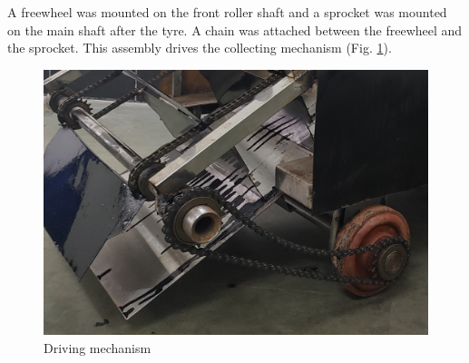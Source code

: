 A freewheel was mounted on the front roller shaft and a sprocket was mounted on the main shaft after the tyre. A chain was attached between the freewheel and the sprocket. This assembly drives the collecting mechanism (Fig. \ref{driving mechanism}).

\begin{figure}[H]
    \centering
    \includegraphics[scale=0.19]{driving mechanism.jpg}
    \caption{Driving mechanism}
    \label{driving mechanism}
\end{figure}





 


